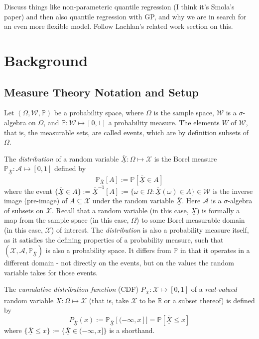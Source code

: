 \documentclass[twoside]{article} \usepackage{aistats2017}
\newcommand{\rv}[1]{\underline{\overline{#1}}}
\newcommand{\warn}[1]{{\color{red} #1}}
\begin{document}
	\warn{Discuss things like non-parameteric quantile regression (I think it's Smola's paper) and then also quantile regression with GP, and why we are in search for an even more flexible model. Follow Lachlan's related work section on this.}
	
\section{Background}

	\subsection{Measure Theory Notation and Setup} %
	
	
		Let $(\Omega, \mathcal{W}, \mathbb{P})$ be a probability space, where $\Omega$ is the sample space, $\mathcal{W}$ is a $\sigma$-algebra on $\Omega$, and $\mathbb{P} : \mathcal{W} \mapsto [0, 1]$ a probability measure. The elements $W$ of $\mathcal{W}$, that is, the measurable sets, are called events, which are by definition subsets of $\Omega$.
		
		The \textit{distribution} of a random variable $\rv{X} : \Omega \mapsto \mathcal{X}$ is the Borel measure $\mathbb{P}_{\rv{X}} : \mathcal{A} \mapsto [0, 1]$ defined by
		\begin{equation}
			\mathbb{P}_{\rv{X}}[A] := \mathbb{P}[\rv{X} \in A]
		\label{eq:distribution}
		\end{equation}
		where the event $\{\rv{X} \in A\} := \rv{X}^{-1}[A] := \{\omega \in \Omega : \rv{X}(\omega) \in A\} \in \mathcal{W}$ is the inverse image (pre-image) of $A \subseteq \mathcal{X}$ under the random variable $\rv{X}$. Here $\mathcal{A}$ is a $\sigma$-algebra of subsets on $\mathcal{X}$. Recall that a random variable (in this case, $\rv{X}$) is formally a map from the sample space (in this case, $\Omega$) to some Borel measurable domain (in this case, $\mathcal{X}$) of interest. The \textit{distribution} is also a probability measure itself, as it satisfies the defining properties of a probability measure, such that $(\mathcal{X}, \mathcal{A}, \mathbb{P}_{\rv{X}})$ is also a probability space. It differs from $\mathbb{P}$ in that it operates in a different domain - not directly on the events, but on the values the random variable takes for those events. 
		
		The \textit{cumulative distribution function} (CDF) $P_{\rv{X}} : \mathcal{X} \mapsto [0, 1]$ of a \textit{real-valued} random variable $\rv{X} : \Omega \mapsto \mathcal{X}$ (that is, take $\mathcal{X}$ to be $\mathbb{R}$ or a subset thereof) is defined by
		\begin{equation}
			P_{\rv{X}}(x) := \mathbb{P}_{\rv{X}}[(-\infty, x]] = \mathbb{P}[\rv{X} \leq x]
		\label{eq:cdf}
		\end{equation}
		where $\{\rv{X} \leq x\} := \{\rv{X} \in (-\infty, x]\}$ is a shorthand.
\end{document}
